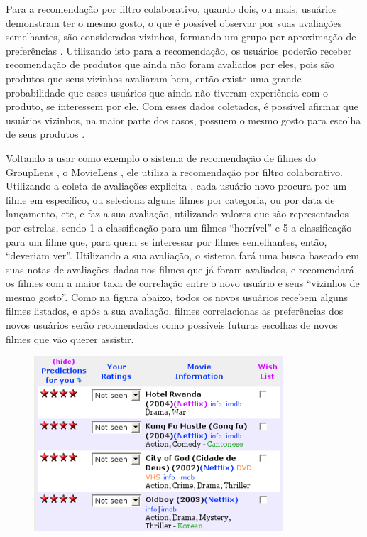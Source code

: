 \documentclass[12pt,
				openright,
				twoside,
				a4paper,
				apter=TITLE,
				section=TITLE,
				subsection=TITLE,
				chapter=TITLE,
				english,
				brazil]{abntex2}
\begin{document}
Para a recomendação por filtro colaborativo, quando dois, ou mais, usuários demonstram ter o mesmo gosto, o que é possível observar por suas avaliações semelhantes, são considerados vizinhos, formando um grupo por aproximação de preferências \cite{asanov2011algorithms}. Utilizando isto para a recomendação, os usuários poderão receber recomendação de produtos que ainda não foram avaliados por eles, pois são produtos que seus vizinhos avaliaram bem, então existe uma grande probabilidade que esses usuários que ainda não tiveram experiência com o produto, se interessem por ele. Com esses dados coletados, é possível afirmar que usuários vizinhos, na maior parte dos casos, possuem o mesmo gosto para escolha de seus produtos \cite{miller2003movielens}.

Voltando a usar como exemplo o sistema de recomendação de filmes do GroupLens \cite{resnick1994grouplen} \cite{konstan1997grouplens}, o MovieLens \cite{miller2003movielens}, ele utiliza a recomendação por filtro colaborativo. Utilizando a coleta de avaliações explicita \cite{melville2010recommender}, cada usuário novo procura por um filme em específico, ou seleciona alguns filmes por categoria, ou por data de lançamento, etc, e faz a sua avaliação, utilizando valores que são representados por estrelas, sendo 1 a classificação para um filmes ``horrível'' e 5 a classificação para um filme que, para quem se interessar por filmes semelhantes, então, ``deveriam ver''. Utilizando a sua avaliação, o sistema fará uma busca baseado em suas notas de avaliações dadas nos filmes que já foram avaliados, e recomendará os filmes com a maior taxa de correlação entre o novo usuário e seus ``vizinhos de mesmo gosto''. Como na figura abaixo, todos os novos usuários recebem alguns filmes listados, e após a sua avaliação, filmes correlacionas as preferências dos novos usuários serão recomendados como possíveis futuras escolhas de novos filmes que vão querer assistir.

\begin{figure}
\centering
\includegraphics[scale=0.4]{img/movielens2}
\end{figure}
\end{document}
